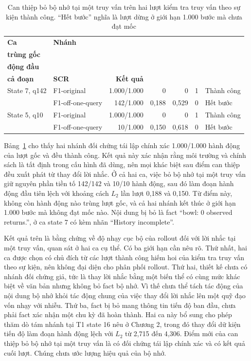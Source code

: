\begin{table}[htbp]
\centering\small
\caption{Can thiệp bỏ bộ nhớ tại một truy vấn trên hai lượt kiểm tra truy vấn theo sự kiện thành công. ``Hết bước'' nghĩa là lượt dừng ở giới hạn 1.000 bước mà chưa đạt mốc}
\label{tab:e45-one-query}
\setlength{\tabcolsep}{3.5pt}
\begin{tabular}{llrrrrl}
\toprule
\textbf{Ca} & \textbf{Nhánh} & \shortstack{\textbf{Hành động}\\\textbf{trùng gốc}} & \shortstack{\textbf{$L_2$ hành}\\\textbf{động đầu}} & \shortstack{\textbf{$L_2$}\\\textbf{cả đoạn}} & \textbf{SCR} & \textbf{Kết quả} \\
\midrule
State 7, q142 & F1-original & 1.000/1.000 & 0 & 0 & 1 & Thành công \\
 & F1-off-one-query & 142/1.000 & 0,188 & 0,529 & 0 & Hết bước \\
\midrule
State 5, q10 & F1-original & 1.000/1.000 & 0 & 0 & 1 & Thành công \\
 & F1-off-one-query & 10/1.000 & 0,150 & 0,618 & 0 & Hết bước \\
\bottomrule
\end{tabular}
\end{table}

Bảng~\ref{tab:e45-one-query} cho thấy hai nhánh đối chứng tái lập chính xác 1.000/1.000 hành động của lượt gốc và đều thành công. Kết quả này xác nhận rằng môi trường và chính sách là tất định trong cấu hình đã dùng, nên mọi khác biệt sau điểm can thiệp đều xuất phát từ thay đổi lời nhắc. Ở cả hai ca, việc bỏ bộ nhớ tại một truy vấn giữ nguyên phần tiền tố 142/142 và 10/10 hành động, sau đó làm đoạn hành động đầu tiên lệch với khoảng cách $L_2$ lần lượt 0,188 và 0,150. Từ điểm này, không còn hành động nào trùng lượt gốc, và cả hai nhánh kết thúc ở giới hạn 1.000 bước mà không đạt mốc nào. Nội dung bị bỏ là fact ``bowl: 0 observed returns.'', ở ca state 7 có kèm nhãn ``History incomplete''.

Kết quả trên là bằng chứng về độ nhạy cục bộ của rollout đối với lời nhắc tại một truy vấn, quan sát ở hai ca cụ thể. Có ba giới hạn cần nêu rõ. Thứ nhất, hai ca được chọn có chủ đích từ các lượt thành công hiếm hoi của kiểm tra truy vấn theo sự kiện, nên không đại diện cho phân phối rollout. Thứ hai, thiết kế chưa có nhánh đối chứng giả, tức là thay lời nhắc bằng một biến thể có cùng mức khác biệt về văn bản nhưng không bỏ fact bộ nhớ. Vì thế chưa thể tách tác động của nội dung bộ nhớ khỏi tác động chung của việc thay đổi lời nhắc lên một quỹ đạo vốn nhạy với nhiễu. Thứ ba, fact bị bỏ mang thông tin tiến độ ban đầu, chưa phải fact xác nhận một chu kỳ đã hoàn thành. Hai ca này bổ sung cho phép thăm dò tám nhánh tại T1 state 16 nêu ở Chương 2, trong đó thay đổi dữ kiện tiến độ làm đoạn hành động lệch với $L_2$ từ 2,715 đến 4,306. Điểm mới của can thiệp bỏ bộ nhớ tại một truy vấn là có đối chứng tái lập chính xác và có kết quả cuối lượt. Chúng chưa ước lượng hiệu quả của bộ nhớ.

